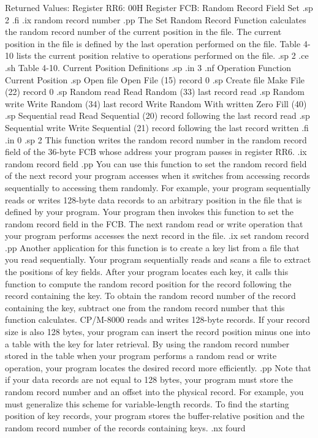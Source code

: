                 Returned  Values:
                   Register  RR6:  00H
                   Register  FCB:  Random Record
                                   Field Set
.sp 2
.fi
.ix random record number
.pp
The Set Random Record Function calculates the random record number of the
current position in the file. The current position in 
the file is defined by the last operation performed on the file.
Table 4-10 lists the current position relative to operations
performed on the file.
.sp 2
.ce
.sh
Table 4-10.  Current Position Definitions
.sp
.in 3
.nf
   Operation             Function          Current Position
.sp
Open file          Open File (15)          record 0   
.sp
Create file        Make File (22)          record 0
.sp
Random read        Read Random (33)        last record read
.sp
Random write       Write Random (34)       last record 
                   Write Random  With      written
                     Zero Fill (40)
.sp
Sequential read    Read Sequential (20)    record following 
                                           the last record 
                                           read
.sp 
Sequential write   Write Sequential (21)   record following
                                           the last record 
                                           written
.fi
.in 0
.sp 2
This function writes the random record number in the random record field
of the 36-byte FCB whose address your program passes in register  RR6.
.ix random record field
.pp
You can use this function to set the random record field of the
next record your program accesses when it switches from 
accessing records sequentially to accessing them randomly. For
example, your program sequentially reads or writes 128-byte data records to an
arbitrary position in the file that is defined by your program.  Your program 
then invokes this function to set the random record field in the FCB. 
The next random read or write operation that your program performs 
accesses the next record in the file. 
.ix set random record
.pp
Another application for this function is to create a key list from a file
that you read sequentially. Your program sequentially reads and scans a
file to extract the positions of key fields. After your program locates
each key, it calls this function to compute the random record position for
the record following the record containing the key.  To obtain the random
record number of the record containing the key, subtract one from
the random record number that this function calculates. CP/M-8000 reads and
writes 128-byte records. If your record size is also 128 bytes, your
program can insert the record position minus one into a table with the key
for later retrieval. By using the random record number stored in the table
when your program performs a random read or write operation, your program
locates the desired record more efficiently. 
.pp
Note that if your data records are not equal to 128 bytes, your program
must store the random record number and an offset into the physical record.
For example, you must generalize this scheme for variable-length records.
To find the starting position of key records, your program stores the
buffer-relative position and the random record number of the records
containing keys. 
.nx fourd

